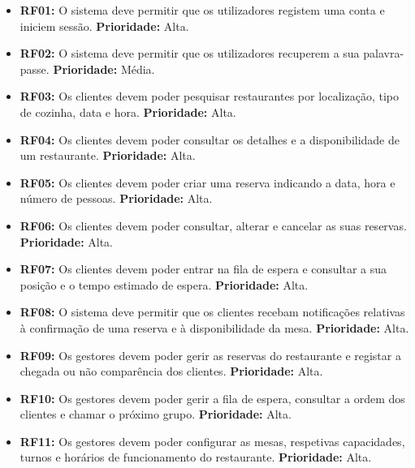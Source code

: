 \begin{itemize}
    \setlength{\itemsep}{10pt}

    \item \textbf{RF01:} O sistema deve permitir que os utilizadores registem uma conta e iniciem sessão. \textbf{Prioridade:} Alta.

    \item \textbf{RF02:} O sistema deve permitir que os utilizadores recuperem a sua palavra-passe. \textbf{Prioridade:} Média.

    \item \textbf{RF03:} Os clientes devem poder pesquisar restaurantes por localização, tipo de cozinha, data e hora. \textbf{Prioridade:} Alta.

    \item \textbf{RF04:} Os clientes devem poder consultar os detalhes e a disponibilidade de um restaurante. \textbf{Prioridade:} Alta.

    \item \textbf{RF05:} Os clientes devem poder criar uma reserva indicando a data, hora e número de pessoas. \textbf{Prioridade:} Alta.

    \item \textbf{RF06:} Os clientes devem poder consultar, alterar e cancelar as suas reservas. \textbf{Prioridade:} Alta.

    \item \textbf{RF07:} Os clientes devem poder entrar na fila de espera e consultar a sua posição e o tempo estimado de espera. \textbf{Prioridade:} Alta.

    \item \textbf{RF08:} O sistema deve permitir que os clientes recebam notificações relativas à confirmação de uma reserva e à disponibilidade da mesa. \textbf{Prioridade:} Alta.

    \item \textbf{RF09:} Os gestores devem poder gerir as reservas do restaurante e registar a chegada ou não comparência dos clientes. \textbf{Prioridade:} Alta.

    \item \textbf{RF10:} Os gestores devem poder gerir a fila de espera, consultar a ordem dos clientes e chamar o próximo grupo. \textbf{Prioridade:} Alta.

    \item \textbf{RF11:} Os gestores devem poder configurar as mesas, respetivas capacidades, turnos e horários de funcionamento do restaurante. \textbf{Prioridade:} Alta.


\end{itemize}
